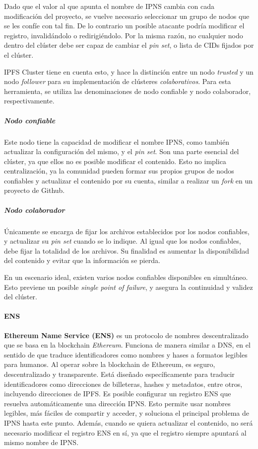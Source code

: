 Dado que el valor al que apunta el nombre de IPNS cambia con cada modificación del proyecto, se vuelve necesario seleccionar un grupo de nodos que se les confíe con tal fin. De lo contrario un posible atacante podría modificar el registro, invalidándolo o redirigiéndolo. Por la misma razón, no cualquier nodo dentro del clúster debe ser capaz de cambiar el \textit{pin set}, o lista de CIDs fijados por el clúster.

IPFS Cluster tiene en cuenta esto, y hace la distinción entre un nodo \textit{trusted} y un nodo \textit{follower} para su implementación de clústeres \textit{colaborativos}\cite{ipfs-cluster-collaborative}. Para esta herramienta, se utiliza las denominaciones de nodo confiable y nodo colaborador, respectivamente.

\subparagraph{Nodo confiable} Este nodo tiene la capacidad de modificar el nombre IPNS, como también actualizar la configuración del mismo, y el \textit{pin set}. Son una parte esencial del clúster, ya que ellos no es posible modificar el contenido. Esto no implica centralización, ya la comunidad pueden formar sus propios grupos de nodos confiables y actualizar el contenido por su cuenta, similar a realizar un \textit{fork} en un proyecto de Github.

\subparagraph{Nodo colaborador} Únicamente se encarga de fijar los archivos establecidos por los nodos confiables, y actualizar su \textit{pin set} cuando se lo indique. Al igual que los nodos confiables, debe fijar la totalidad de los archivos. Su finalidad es aumentar la disponibilidad del contenido y evitar que la información se pierda.

En un escenario ideal, existen varios nodos confiables disponibles en simultáneo. Esto previene un posible \textit{single point of failure}, y asegura la continuidad y validez del clúster.

\paragraph{ENS} \textbf{Ethereum Name Service (ENS)} \cite{ens} es un protocolo de nombres descentralizado que se basa en la blockchain \textit{Ethereum}. Funciona de manera similar a DNS, en el sentido de que traduce identificadores como nombres y hases a formatos legibles para humanos. Al operar sobre la blockchain de Ethereum, es seguro, descentralizado y transparente. Está diseñado específicamente para traducir identificadores como direcciones de billeteras, hashes y metadatos, entre otros, incluyendo direcciones de IPFS. Es posible configurar un registro ENS que resuelva automáticamente una dirección IPNS. Esto permite usar nombres legibles, más fáciles de compartir y acceder, y soluciona el principal problema de IPNS hasta este punto. Además, cuando se quiera actualizar el contenido, no será necesario modificar el registro ENS en sí, ya que el registro siempre apuntará al mismo nombre de IPNS.

